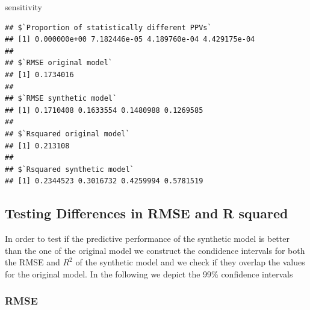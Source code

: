 \documentclass[]{article}
\newenvironment{Shaded}{\begin{snugshade}}{\end{snugshade}}
\newcommand{\DataTypeTok}[1]{\textcolor[rgb]{0.13,0.29,0.53}{#1}}
\newcommand{\DecValTok}[1]{\textcolor[rgb]{0.00,0.00,0.81}{#1}}
\newcommand{\FloatTok}[1]{\textcolor[rgb]{0.00,0.00,0.81}{#1}}
\newcommand{\KeywordTok}[1]{\textcolor[rgb]{0.13,0.29,0.53}{\textbf{#1}}}
\newcommand{\NormalTok}[1]{#1}
\newcommand{\OperatorTok}[1]{\textcolor[rgb]{0.81,0.36,0.00}{\textbf{#1}}}
\newcommand{\StringTok}[1]{\textcolor[rgb]{0.31,0.60,0.02}{#1}}
\begin{document}
\begin{Shaded}
\end{Shaded}

\begin{Shaded}
\begin{Highlighting}[]
\NormalTok{sensitivity}
\end{Highlighting}
\end{Shaded}

\begin{verbatim}
## $`Proportion of statistically different PPVs`
## [1] 0.000000e+00 7.182446e-05 4.189760e-04 4.429175e-04
## 
## $`RMSE original model`
## [1] 0.1734016
## 
## $`RMSE synthetic model`
## [1] 0.1710408 0.1633554 0.1480988 0.1269585
## 
## $`Rsquared original model`
## [1] 0.213108
## 
## $`Rsquared synthetic model`
## [1] 0.2344523 0.3016732 0.4259994 0.5781519
\end{verbatim}

\hypertarget{testing-differences-in-rmse-and-r-squared}{%
\subsection{Testing Differences in RMSE and R
squared}\label{testing-differences-in-rmse-and-r-squared}}

In order to test if the predictive performance of the synthetic model is
better than the one of the original model we construct the condidence
intervals for both the RMSE and \(R^2\) of the synthetic model and we
check if they overlap the values for the original model. In the
following we depict the 99\% confidence intervals

\hypertarget{rmse}{%
\subsubsection{RMSE}\label{rmse}}
\end{document}
